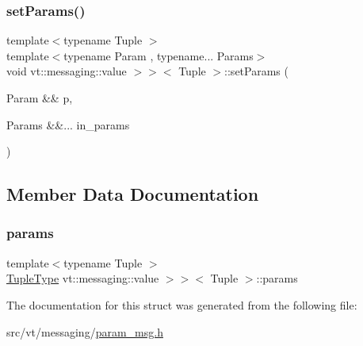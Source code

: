 \subsubsection{\texorpdfstring{set\+Params()}{setParams()}\hspace{0.1cm}{\footnotesize\ttfamily [2/2]}}
{\footnotesize\ttfamily template$<$typename Tuple $>$ \\
template$<$typename Param , typename... Params$>$ \\
void vt\+::messaging\+::value $>$$>$$<$ Tuple $>$\+::set\+Params (\begin{DoxyParamCaption}\item[{Param \&\&}]{p,  }\item[{Params \&\&...}]{in\+\_\+params }\end{DoxyParamCaption})\hspace{0.3cm}{\ttfamily [inline]}}



\subsection{Member Data Documentation}
\mbox{\label{structvt_1_1messaging_1_1_param_msg_3_01_tuple_00_01std_1_1enable__if__t_3_01is__byte__copyable_50e4a53750896883a846627550850f59_a69170a79900e7a5b7d4a02e05aff9b2d}} 
\subsubsection{\texorpdfstring{params}{params}}
{\footnotesize\ttfamily template$<$typename Tuple $>$ \\
\hyperlink{structvt_1_1messaging_1_1_param_msg_3_01_tuple_00_01std_1_1enable__if__t_3_01is__byte__copyable_50e4a53750896883a846627550850f59_a63c0c672da0bf7b284da9647aad497f8}{Tuple\+Type} vt\+::messaging\+::value $>$$>$$<$ Tuple $>$\+::params}



The documentation for this struct was generated from the following file\+:\begin{DoxyCompactItemize}
\item 
src/vt/messaging/\hyperlink{param__msg_8h}{param\+\_\+msg.\+h}\end{DoxyCompactItemize}
